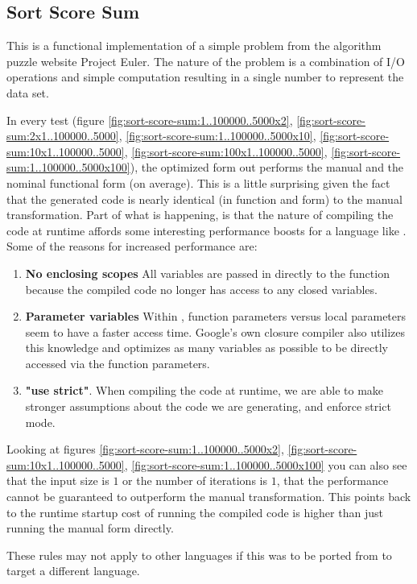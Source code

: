 \subsection{Sort Score Sum}
This is a functional implementation of a simple problem from the algorithm puzzle website Project Euler.  The nature of the problem is a combination of I/O operations and simple computation resulting in a single number to represent the data set. \cite{euler05}

In every test (figure \ref{fig:sort-score-sum:1..100000..5000x2}, \ref{fig:sort-score-sum:2x1..100000..5000}, \ref{fig:sort-score-sum:1..100000..5000x10}, \ref{fig:sort-score-sum:10x1..100000..5000}, \ref{fig:sort-score-sum:100x1..100000..5000}, \ref{fig:sort-score-sum:1..100000..5000x100}), the optimized form out performs the manual and the nominal functional form (on average).  This is a little surprising given the fact that the generated code is nearly identical (in function and form) to the manual transformation.  Part of what is happening,  is that the nature of compiling the code at runtime affords some interesting performance boosts for a language like \javascript. Some of the reasons for increased performance are:
\begin{enumerate}
  \item \textbf{No enclosing scopes} All variables are passed in directly to the function because the compiled code no longer has access to any closed variables.
  \item \textbf{Parameter variables}  Within \veight, function parameters versus local parameters seem to have a faster access time.  Google's own closure compiler also utilizes this knowledge and optimizes as many variables as possible to be directly accessed via the function parameters. 
  \item \textbf{"use strict"}.  When compiling the code at runtime, we are able to make stronger assumptions about the code we are generating, and enforce strict mode.     
\end{enumerate}

Looking at figures \ref{fig:sort-score-sum:1..100000..5000x2}, \ref{fig:sort-score-sum:10x1..100000..5000}, \ref{fig:sort-score-sum:1..100000..5000x100} you can also see that the input size is $1$ or the number of iterations is $1$, that the performance cannot be guaranteed to outperform the manual transformation.  This points back to the runtime startup cost of running the compiled code is higher than just running the manual form directly. 

These rules may not apply to other languages if this was to be ported from \javascript to target a different language.

